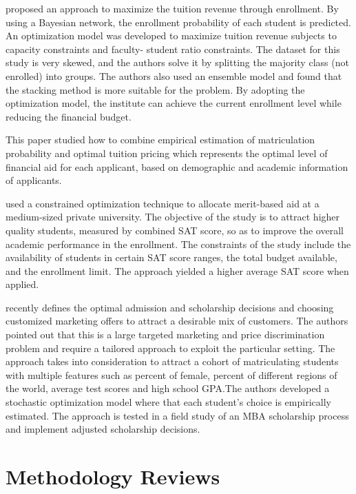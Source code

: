 \documentclass[12pt,english]{report}
\begin{document}
\citet{Thanh2007} proposed an approach to maximize the tuition revenue 
through enrollment. By using a Bayesian network, the enrollment probability 
of each student is predicted.  An optimization model was developed to 
maximize  tuition revenue subjects to capacity constraints and faculty-
student ratio constraints. The dataset for this study is very skewed, and the
authors solve it by splitting the majority class (not enrolled) into groups.
The authors  also used an ensemble model and found that the stacking method 
is more  suitable for the problem. By adopting the optimization model, the
institute  can achieve the current enrollment level while reducing the
financial budget.


\citet{Bosshardt2010} This paper studied how to combine empirical estimation 
of matriculation probability and optimal tuition pricing  which represents 
the optimal level of financial aid for each applicant, based on demographic 
and academic information of applicants.

\citet{Sugrue2010} used a constrained optimization technique to allocate
merit-based aid at a medium-sized private university. The objective of the
study is to attract higher quality students, measured by combined SAT score, 
so as to improve the overall academic performance in the enrollment. The
constraints of the study include the availability of students in certain SAT
score ranges, the total budget available, and the enrollment limit. The
approach yielded a higher average SAT score when applied.


\citet{Belloni2012} recently defines the optimal admission and scholarship
decisions and choosing customized marketing offers to attract a desirable mix
of customers.  The authors pointed out that this is a large targeted 
marketing and price discrimination problem and require a tailored approach to
exploit the particular setting.  The approach takes into consideration to
attract a cohort of matriculating students with multiple features such as
percent of female, percent of different regions of the world, average test
scores and high school GPA.The authors developed a stochastic optimization
model where that each student's choice is empirically estimated. The approach
is tested in a field study of an MBA scholarship process and implement 
adjusted scholarship decisions.
\section{Methodology Reviews}
\end{document}

